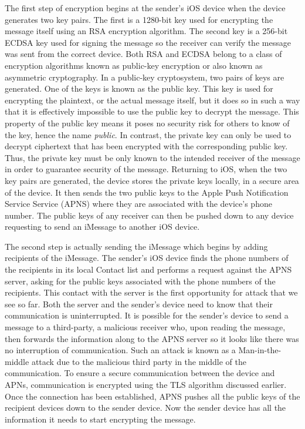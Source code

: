 The first step of encryption begins at the sender's iOS device when the device
generates two key pairs.  The first is a 1280-bit key used for encrypting the
message itself using an RSA encryption algorithm.  The second key is a 256-bit
ECDSA key used for signing the message so the receiver can verify the message
was sent from the correct device.  Both RSA and ECDSA 
belong to a class of encryption algorithms known as public-key encryption or
also known as asymmetric cryptography. In a public-key cryptosystem, two pairs
of keys are generated.  One of the keys is known as the public key.  This key
is used for encrypting the plaintext, or the actual message itself, but it does
so in such a way that it is effectively impossible to use the public key to
decrypt the message.  This property of the public key means it poses no
security risk for others to know of the key, hence the name \textit{public}.  In
contrast, the private key can only be used to decrypt ciphertext that has been
encrypted with the corresponding public key.  Thus, the private key must be
only known to the intended receiver of the message in order to guarantee
security of the message.  Returning to iOS, when the two key pairs are
generated, the device stores the private keys locally, in a secure area of the
device.  It then sends the two public keys to the Apple Push Notification
Service Service (APNS) where they are associated with the device's phone number.
The public keys of any receiver can then be pushed down to any device
requesting to send an iMessage to another iOS device.

The second step is actually sending the iMessage which begins by adding
recipients of the iMessage.  The sender's iOS device finds the phone numbers of
the recipients in its local Contact list and performs a request against the
APNS server, asking for the public keys associated with the phone numbers of
the recipients.  This contact with the server is the first opportunity for
attack that we see so far.  Both the server and the sender's device need to
know that their communication is uninterrupted.  It is possible for the
sender's device to send a message to a third-party, a malicious receiver who,
upon reading the message, then forwards the information along to the APNS
server so it looks like there was no interruption of communication.  Such an
attack is known as a Man-in-the-middle attack due to the malicious third party
in the middle of the communication.  To ensure a secure communication between
the device and APNs, communication is encrypted using the TLS algorithm
discussed earlier.  Once the connection has been established, APNS pushes all
the public keys of the recipient devices down to the sender device.  Now the
sender device has all the information it needs to start encrypting the message.

